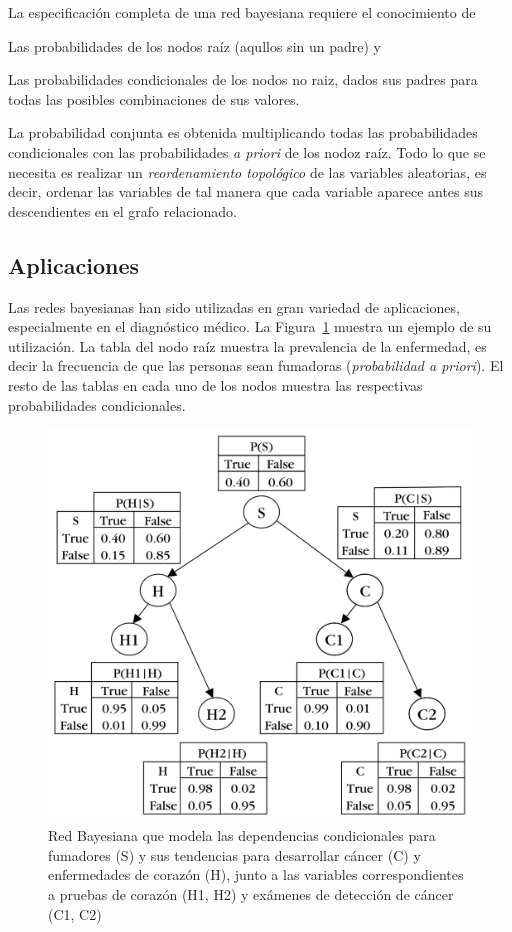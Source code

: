 \documentclass{article}
\begin{document}
La especificación completa de una red bayesiana requiere el conocimiento de
\begin{enumerate*}
  \item Las probabilidades de los nodos raíz (aqullos sin un padre) y 
  \item Las probabilidades condicionales de los nodos no raiz, dados sus padres para todas las posibles combinaciones de sus valores.
\end{enumerate*}
La probabilidad conjunta es obtenida multiplicando todas las probabilidades condicionales con las probabilidades \emph{a priori} de los nodoz raíz.
Todo lo que se necesita es realizar un \emph{reordenamiento topológico} de las variables aleatorias, es decir, ordenar las variables de tal manera que cada variable aparece antes sus descendientes en el grafo relacionado.

\subsection{Aplicaciones} 
\label{sec:aplicaciones}
Las redes bayesianas han sido utilizadas en gran variedad de aplicaciones, especialmente en el diagnóstico médico.
La Figura~\ref{fig:ejemplo-red-bayesiana} muestra un ejemplo de su utilización.
La tabla del nodo raíz muestra la prevalencia de la enfermedad, es decir la frecuencia de que las personas sean fumadoras (\emph{probabilidad a priori}).
El resto de las tablas en cada uno de los nodos muestra las respectivas probabilidades condicionales.
\begin{figure}[h]
	\centering
	\includegraphics[scale=0.25]{resources/images/ejemplo-red-bayesiana}
	\caption{Red Bayesiana que modela las dependencias condicionales para fumadores (S) y sus tendencias para desarrollar cáncer (C) y enfermedades de corazón (H), junto a las variables correspondientes a pruebas de corazón (H1, H2) y exámenes de detección de cáncer (C1, C2)}
	\label{fig:ejemplo-red-bayesiana}
\end{figure}
\end{document}
